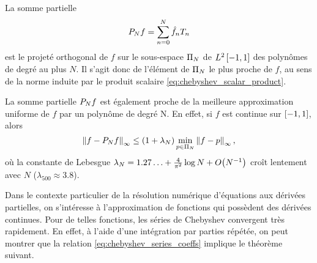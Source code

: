 La somme partielle
\begin{equation}
	\truncseries{f}{N} = \sum_{n=0}^{N} \hat{f}_n T_n
	\label{chebyshev_truncated_series}
\end{equation}
est le projeté orthogonal de $f$ sur le sous-espace $\polyspace{N}$ de $\Ltwospace$ des polynômes de degré au plus $N$.
Il s'agit donc de l'élément de $\polyspace{N}$ le plus proche de $f$, au sens de la norme induite par le produit scalaire \eqref{eq:chebyshev_scalar_product}.\par
La somme partielle $\truncseries{f}{N}$ est également proche de la meilleure approximation uniforme de $f$ par un polynôme de degré N. 
En effet, si $f$ est continue sur $\chebinterval$, alors
\begin{equation}
	\norminf{f - \truncseries{f}{N}} 
	\leq 
	\left(1 + \lambda_N \right) 
	\min_{p \in \polyspace{N}} \norminf{f - p},
	\label{eq:chebyshev_near_minimax}
\end{equation}
où la constante de Lebesgue $\lambda_N = 1.27\ldots + \frac{4}{\pi^2} \log N + \bigO{N^{-1}}$ croît %
lentement avec $N$ ($\lambda_{500} \approx 3.8$).\par
Dans le contexte particulier de la résolution numérique d'équations aux dérivées partielles, %
on s'intéresse à l'approximation de fonctions qui possèdent des dérivées continues.
Pour de telles fonctions, les séries de Chebyshev convergent très rapidement. 
En effet, à l'aide d'une intégration par parties répétée, on peut montrer que la relation \eqref{eq:chebyshev_series_coeffs} implique le théorème suivant.
